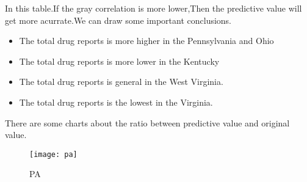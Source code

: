 \documentclass{mcmthesis}
\begin{document}
\noindent In this table.If the gray correlation is more lower,Then the predictive value will get more acurrate.We can draw some important conclusions.\\
\begin{itemize}
	\item The total drug reports is more higher in the Pennsylvania and Ohio\\%
	\item The total drug reports is more lower in the Kentucky\\%
	\item The total drug reports is general in the West Virginia.\\%
	\item The total drug reports is the lowest in the Virginia.\\%
\end{itemize}
There are some charts about the ratio between predictive value and original value.\\
\begin{figure}[!h]
	\centering
	\texttt{[image: pa]}
	\caption{PA}
	\label{PA}
\end{figure}
 \begin{figure}[htbp]
	\centering
\end{figure}
 \begin{figure}[htbp]
	\centering
\end{figure}
\newpage
\end{document}
